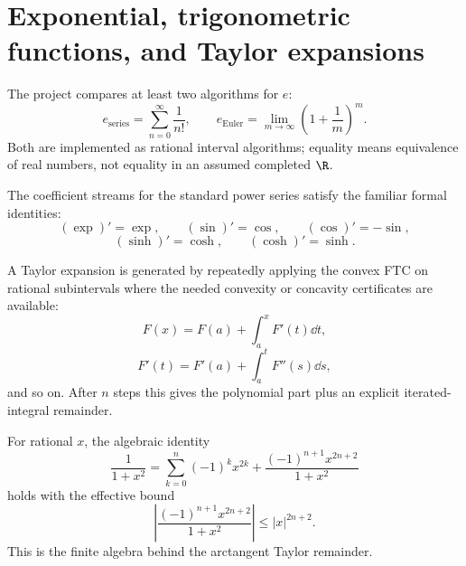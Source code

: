 \section{Exponential, trigonometric functions, and Taylor expansions}

\begin{definition}\label{def:exp-reps}
The project compares at least two algorithms for \(e\):
\[
  e_{\mathrm{series}}
  =
  \sum_{n=0}^{\infty}\frac1{n!},
  \qquad
  e_{\mathrm{Euler}}
  =
  \lim_{m\to\infty}\left(1+\frac1m\right)^m.
\]
Both are implemented as rational interval algorithms; equality means
equivalence of real numbers, not equality in an assumed completed \(\R\).
\end{definition}

\begin{theorem}\label{thm:formal-derivative-table}
The coefficient streams for the standard power series satisfy the familiar
formal identities:
\[
  (\exp)'=\exp,\qquad
  (\sin)'=\cos,\qquad
  (\cos)'=-\sin,
\]
\[
  (\sinh)'=\cosh,\qquad
  (\cosh)'=\sinh.
\]
\end{theorem}

\begin{definition}\label{def:taylor-iterated-ftc}
A Taylor expansion is generated by repeatedly applying the convex FTC on
rational subintervals where the needed convexity or concavity certificates are
available:
\[
  F(x)
  =
  F(a)+\int_a^x F'(t)\dd t,
\]
\[
  F'(t)
  =
  F'(a)+\int_a^t F''(s)\dd s,
\]
and so on.  After \(n\) steps this gives the polynomial part plus an
explicit iterated-integral remainder.
\end{definition}

\begin{theorem}\label{thm:atan-kernel-rem}
\leanok
For rational \(x\), the algebraic identity
\[
  \frac{1}{1+x^2}
  =
  \sum_{k=0}^{n} (-1)^k x^{2k}
  +
  \frac{(-1)^{n+1}x^{2n+2}}{1+x^2}
\]
holds with the effective bound
\[
  \left|
    \frac{(-1)^{n+1}x^{2n+2}}{1+x^2}
  \right|
  \le |x|^{2n+2}.
\]
This is the finite algebra behind the arctangent Taylor remainder.
\end{theorem}

